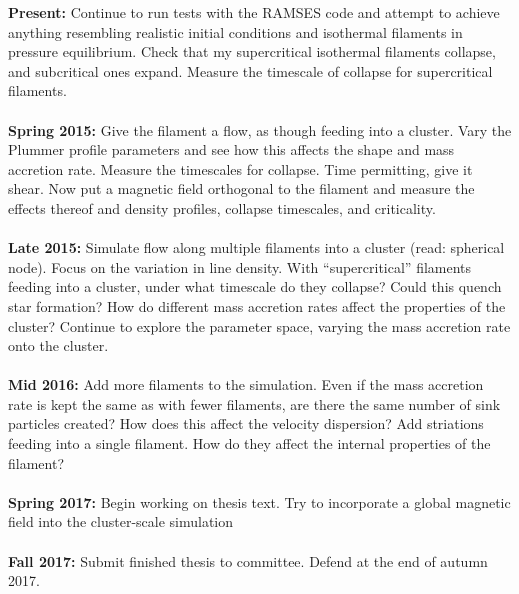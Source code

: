 \documentclass[a4paper,12pt]{article}
\begin{document}
\textbf{Present:} Continue to run tests with the RAMSES code and attempt to achieve anything resembling realistic initial conditions and isothermal filaments in pressure equilibrium. Check that my supercritical isothermal filaments collapse, and subcritical ones expand. Measure the timescale of collapse for supercritical filaments.\\ \\ \textbf{Spring 2015:} Give the filament a flow, as though feeding into a cluster. Vary the Plummer profile parameters and see how this affects the shape and mass accretion rate. Measure the timescales for collapse. Time permitting, give it shear. Now put a magnetic field orthogonal to the filament and measure the effects thereof and density profiles, collapse timescales, and criticality.\\ \\\textbf{Late 2015:} Simulate flow along multiple filaments into a cluster (read: spherical node). Focus on the variation in line density. With ``supercritical'' filaments feeding into a cluster, under what timescale do they collapse? Could this quench star formation? How do different mass accretion rates affect the properties of the cluster? Continue to explore the parameter space, varying the mass accretion rate onto the cluster.\\ \\ \textbf{Mid 2016:} Add more filaments to the simulation. Even if the mass accretion rate is kept the same as with fewer filaments, are there the same number of sink particles created? How does this affect the velocity dispersion? Add striations feeding into a single filament. How do they affect the internal properties of the filament?\\ \\ \textbf{Spring 2017:} Begin working on thesis text. Try to incorporate a global magnetic field into the cluster-scale simulation \\ \\ \textbf{Fall 2017:} Submit finished thesis to committee. Defend at the end of autumn 2017.




\singlespacing


\end{document}
